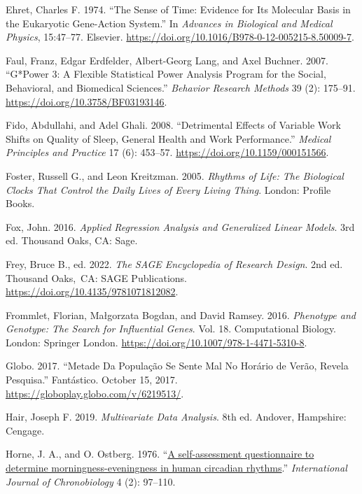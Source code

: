 \documentclass[
  12pt,
  a4paper,
  oneside]{tesesusp}
\newlength{\cslhangindent}
\newlength{\cslentryspacingunit} %
\newenvironment{CSLReferences}[2] %
 {%
  \setlength{\parindent}{0pt}
  \ifodd #1
  \let\oldpar\par
  \def\par{\hangindent=\cslhangindent\oldpar}
  \fi
  \setlength{\parskip}{#2\cslentryspacingunit}
 }%
 {}
\begin{document}
\begin{CSLReferences}{1}{0}
\leavevmode{}%
Ehret, Charles F. 1974. {``The Sense of Time: Evidence for Its Molecular
Basis in the Eukaryotic Gene-Action System.''} In \emph{Advances in
Biological and Medical Physics}, 15:47--77. Elsevier.
\url{https://doi.org/10.1016/B978-0-12-005215-8.50009-7}.

\leavevmode{}%
Faul, Franz, Edgar Erdfelder, Albert-Georg Lang, and Axel Buchner. 2007.
{``G*Power 3: A Flexible Statistical Power Analysis Program for the
Social, Behavioral, and Biomedical Sciences.''} \emph{Behavior Research
Methods} 39 (2): 175--91. \url{https://doi.org/10.3758/BF03193146}.

\leavevmode{}%
Fido, Abdullahi, and Adel Ghali. 2008. {``Detrimental Effects of
Variable Work Shifts on Quality of Sleep, General Health and Work
Performance.''} \emph{Medical Principles and Practice} 17 (6): 453--57.
\url{https://doi.org/10.1159/000151566}.

\leavevmode{}%
Foster, Russell G., and Leon Kreitzman. 2005. \emph{Rhythms of Life: The
Biological Clocks That Control the Daily Lives of Every Living Thing}.
London: Profile Books.

\leavevmode{}%
Fox, John. 2016. \emph{Applied Regression Analysis and Generalized
Linear Models}. 3rd ed. Thousand Oaks, CA: Sage.

\leavevmode{}%
Frey, Bruce B., ed. 2022. \emph{The SAGE Encyclopedia of Research
Design}. 2nd ed. Thousand Oaks,~CA: SAGE Publications.
\url{https://doi.org/10.4135/9781071812082}.

\leavevmode{}%
Frommlet, Florian, Małgorzata Bogdan, and David Ramsey. 2016.
\emph{Phenotype and Genotype: The Search for Influential Genes}. Vol.
18. Computational Biology. London: Springer London.
\url{https://doi.org/10.1007/978-1-4471-5310-8}.

\leavevmode{}%
Globo. 2017. {``Metade Da População Se Sente Mal No Horário de Verão,
Revela Pesquisa.''} Fantástico. October 15, 2017.
\url{https://globoplay.globo.com/v/6219513/}.

\leavevmode{}%
Hair, Joseph F. 2019. \emph{Multivariate Data Analysis}. 8th ed.
Andover, Hampshire: Cengage.

\leavevmode{}%
Horne, J. A., and O. Ostberg. 1976.
{``\href{https://www.ncbi.nlm.nih.gov/pubmed/1027738}{A self-assessment
questionnaire to determine morningness-eveningness in human circadian
rhythms}.''} \emph{International Journal of Chronobiology} 4 (2):
97--110.


\end{CSLReferences}
\end{document}
